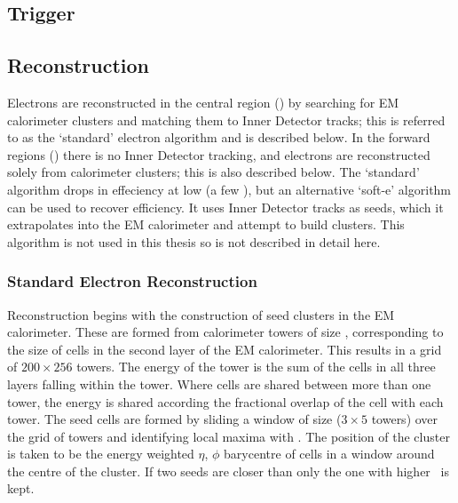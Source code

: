 \subsection{Trigger}
\label{sec:reco-el-triggers}

\subsection{Reconstruction}

Electrons are reconstructed in the central region () by searching
for EM calorimeter clusters and matching them to Inner Detector tracks; this is
referred to as the `standard' electron algorithm and is described below.
In the forward regions () there is no Inner Detector
tracking, and electrons are reconstructed solely from calorimeter clusters; this
is also described below. The `standard' algorithm drops in effeciency at low \pt
(a few \gev), but an alternative `soft-e' algorithm can be used to recover
efficiency. It uses Inner Detector tracks as seeds, which it extrapolates into
the EM calorimeter and attempt to build clusters. This algorithm is not used in
this thesis so is not described in detail here.

\subsubsection{Standard Electron Reconstruction}

Reconstruction begins
with the construction of seed clusters in the EM calorimeter. These are formed from
calorimeter towers of size , corresponding to the
size of cells in the second layer of the EM calorimeter. This
results in a grid of $200 \times 256$ towers. The energy
of the tower is the sum of the cells in all three layers
falling within the tower. Where cells are shared between more than one tower, the
energy is shared according the fractional overlap of the cell with each
tower. The seed cells are formed by sliding a
window of size  ($3 \times 5$ towers) over the
grid of towers and identifying local maxima with . The position
of the cluster is taken to be the energy weighted $\eta$, $\phi$ barycentre of
cells in a window around the centre of the cluster. If two seeds are closer than
 only the one with higher \et\ is kept.

